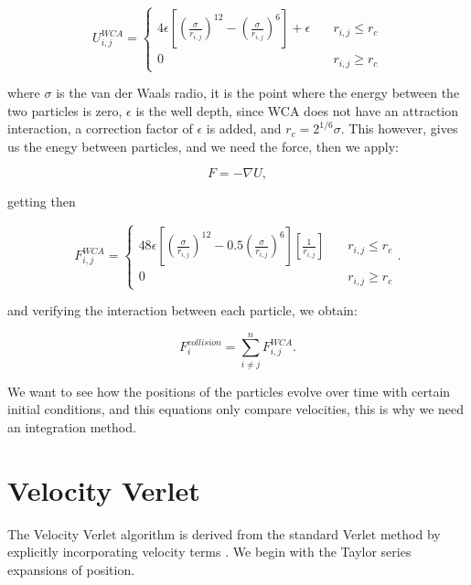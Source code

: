 \begin{equation}
  U_{i,j}^{WCA} = \begin{cases} 
    4\epsilon\left[ \left( \frac{\sigma}{r_{i,j}}\right)^{12} - \left( \frac{\sigma}{r_{i,j}}\right)^6\right] + \epsilon \quad &r_{i,j} \leq r_c \\
    0 \quad & r_{i,j} \geq r_c
  \end{cases}
  \label{eq:wcapotential}
\end{equation}

where $\sigma$ is the van der Waals radio, it is the point where the energy between the two particles is zero, $\epsilon$ is the well depth, since WCA does not have an attraction interaction, a correction factor of $\epsilon$ is added, and $r_c = 2^{1/6}\sigma$. This however, gives us the enegy between particles, and we need the force, then we apply:

\begin{equation}
 F = - \nabla U, 
  \label{eq:negativegradient}
\end{equation}

getting then

\begin{equation}
  F_{i,j}^{WCA} = \begin{cases} 
    48\epsilon\left[ \left( \frac{\sigma}{r_{i,j}}\right)^{12} - 0.5\left( \frac{\sigma}{r_{i,j}}\right)^6\right]\left[ \frac{1}{r_{i,j}}\right] \quad &r_{i,j} \leq r_c \\
    0 \quad & r_{i,j} \geq r_c
  \end{cases}.
  \label{eq:wcaforce}
\end{equation}

and verifying the interaction between each particle, we obtain:

\begin{equation}
  F^{collision}_i = \sum^{n}_{i \neq j} F^{WCA}_{i,j}.  
  \label{eq:wcasum}
\end{equation}

We want to see how the positions of the particles evolve over time with certain initial conditions, and this equations only compare velocities, this is why we need an integration method.

\section{Velocity Verlet}

The Velocity Verlet algorithm is derived from the standard Verlet method by explicitly incorporating velocity terms \cite{verlet1967computer, chambliss2020magnetic}. We begin with the Taylor series expansions of position.

